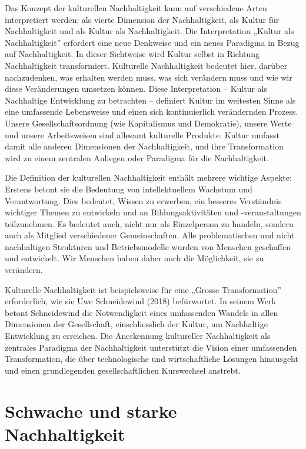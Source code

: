 \documentclass[
  nswissgerman,
  a4paper,
  DIV=11,
  numbers=noendperiod,
  oneside,
  openany]{scrreprt}
\begin{document}
Das Konzept der kulturellen Nachhaltigkeit kann auf verschiedene Arten
interpretiert werden: als vierte Dimension der Nachhaltigkeit, als
Kultur für Nachhaltigkeit und als Kultur als Nachhaltigkeit. Die
Interpretation „Kultur als Nachhaltigkeit'' erfordert eine neue
Denkweise und ein neues Paradigma in Bezug auf Nachhaltigkeit. In dieser
Sichtweise wird Kultur selbst in Richtung Nachhaltigkeit transformiert.
Kulturelle Nachhaltigkeit bedeutet hier, darüber nachzudenken, was
erhalten werden muss, was sich verändern muss und wie wir diese
Veränderungen umsetzen können. Diese Interpretation -- Kultur als
Nachhaltige Entwicklung zu betrachten -- definiert Kultur im weitesten
Sinne als eine umfassende Lebensweise und einen sich kontinuierlich
verändernden Prozess. Unsere Gesellschaftsordnung (wie Kapitalismus und
Demokratie), unsere Werte und unsere Arbeitsweisen sind allesamt
kulturelle Produkte. Kultur umfasst damit alle anderen Dimensionen der
Nachhaltigkeit, und ihre Transformation wird zu einem zentralen Anliegen
oder Paradigma für die Nachhaltigkeit.

Die Definition der kulturellen Nachhaltigkeit enthält mehrere wichtige
Aspekte: Erstens betont sie die Bedeutung von intellektuellem Wachstum
und Verantwortung. Dies bedeutet, Wissen zu erwerben, ein besseres
Verständnis wichtiger Themen zu entwickeln und an Bildungsaktivitäten
und -veranstaltungen teilzunehmen. Es bedeutet auch, nicht nur als
Einzelperson zu handeln, sondern auch als Mitglied verschiedener
Gemeinschaften. Alle problematischen und nicht nachhaltigen Strukturen
und Betriebsmodelle wurden von Menschen geschaffen und entwickelt. Wir
Menschen haben daher auch die Möglichkeit, sie zu verändern.

Kulturelle Nachhaltigkeit ist beispielsweise für eine „Grosse
Transformation'' erforderlich, wie sie Uwe Schneidewind (2018)
befürwortet. In seinem Werk betont Schneidewind die Notwendigkeit eines
umfassenden Wandels in allen Dimensionen der Gesellschaft,
einschliesslich der Kultur, um Nachhaltige Entwicklung zu erreichen. Die
Anerkennung kultureller Nachhaltigkeit als zentrales Paradigma der
Nachhaltigkeit unterstützt die Vision einer umfassenden Transformation,
die über technologische und wirtschaftliche Lösungen hinausgeht und
einen grundlegenden gesellschaftlichen Kurswechsel anstrebt.

\section{Schwache und starke
Nachhaltigkeit}\label{schwache-und-starke-nachhaltigkeit}
\end{document}
